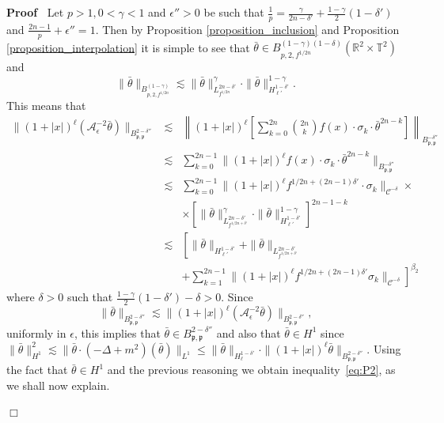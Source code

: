 \documentclass[a4paper,10pt]{article}
\newenvironment{proof}{\noindent\textbf{Proof\ }}{\hspace*{\fill}$\Box$\medskip}
\begin{document}
\begin{proof}
  Let $p > 1, 0 < \gamma < 1$ and $\epsilon'' > 0$ be such that $\frac{1}{p} =
  \frac{\gamma}{2 n - \delta'} + \frac{1 - \gamma}{2} (1 - \delta')$ and
  $\frac{2 n - 1}{p} + \epsilon'' = 1$. Then by Proposition
  \ref{proposition_inclusion} and Proposition \ref{proposition_interpolation}
  it is simple to see that $\bar{\theta} \in B^{(1 - \gamma) (1 - \delta)}_{p,
  2, f^{1 / 2 n}} (\mathbb{R}^2 \times \mathbb{T}^2)$ and
  \[ \| \bar{\theta} \|_{B^{(1 - \gamma)}_{p, 2, f^{1 / 2 n}}} \lesssim \|
     \bar{\theta} \|_{L^{2 n - \delta'}_{f^{1 / 2 n}}}^{\gamma} \cdot \|
     \bar{\theta} \|^{1 - \gamma}_{H^{1 - \delta'}_{\ell'}} . \]
  This means that
  \begin{eqnarray}
    \| (1 + | x |)^{\ell} (\mathcal{A}_{\epsilon}^{- 2} \bar{\theta}) \|_{B^{2
    - \delta''}_{\mathfrak{p}, \mathfrak{p}}} & \lesssim & \left\| (1 + | x
    |)^{\ell} \left[ \sum_{k = 0}^{2 n} \binom{2 n}{k} f (x) \cdot \sigma_k
    \cdot \bar{\theta}^{2 n - k} \right] \right\|_{B^{-
    \delta''}_{\mathfrak{p, \mathfrak{p}}}} \nonumber\\
    & \lesssim & \sum_{k = 0}^{2 n - 1} \| (1 + | x |)^{\ell} f (x) \cdot
    \sigma_k \cdot \bar{\theta}^{2 n - k} \|_{B^{- \delta''}_{\mathfrak{p,
    \mathfrak{p}}}} \nonumber\\
    & \lesssim & \sum_{k = 0}^{2 n - 1} \| (1 + | x |)^{\ell} f^{1 / 2 n + (2
    n - 1) \delta'} \cdot \sigma_k \|_{\mathcal{C}^{- \delta}} \times
    \nonumber\\
    &  & \times \left[ \| \bar{\theta} \|_{L^{2 n - \delta'}_{f^{1 / 2 n +
    \delta'}}}^{\gamma} \cdot \| \bar{\theta} \|^{1 - \gamma}_{H^{1 -
    \delta'}_{\ell'}} \right]^{2 n - 1 - k} \nonumber\\
    & \lesssim & \left[ \| \bar{\theta} \|_{H^{1 - \delta'}_{\ell'}} + \|
    \bar{\theta} \|_{L^{2 n - \delta'}_{f^{1 / 2 n + \delta'}}} \right.
    \nonumber\\
    &  & \left. + \sum_{k = 1}^{2 n - 1} \| (1 + | x |)^{\ell} f^{1 / 2 n +
    (2 n - 1) \delta'} \sigma_k \|_{\mathcal{C}^{- \delta}} \right]^{\beta_2}
    \nonumber
  \end{eqnarray}
  where $\delta > 0$ such that $\frac{1 - \gamma}{2} (1 - \delta') - \delta >
  0$. Since
  \begin{equation}
    \| \bar{\theta} \|_{B^{2 - \delta''}_{\mathfrak{p}, \mathfrak{p}}}
    \lesssim \| (1 + | x |)^{\ell} (\mathcal{A}_{\epsilon}^{- 2} \bar{\theta})
    \|_{B^{2 - \delta''}_{\mathfrak{p}, \mathfrak{p}}}, \label{eq:p2}
  \end{equation}
  uniformly in $\epsilon$, this implies that $\bar{\theta} \in B^{2 -
  \delta''}_{\mathfrak{p}, \mathfrak{p}}$ and also that $\bar{\theta} \in H^1$
  since $\| \bar{\theta} \|_{H^1}^2 \lesssim \| \bar{\theta} \cdot (- \Delta +
  m^2) (\bar{\theta}) \|_{L^1} \leqslant \| \bar{\theta} \|_{H^{1 -
  \delta'}_{\ell}} \cdot \| (1 + | x |)^{\ell} \bar{\theta} \|_{B^{2 -
  \delta''}_{\mathfrak{p}, \mathfrak{p}}}$. Using the fact that $\bar{\theta}
  \in H^1$ and the previous reasoning we obtain inequality~{\eqref{eq:P2}}, as
  we shall now explain.
  

\end{proof}
\end{document}
